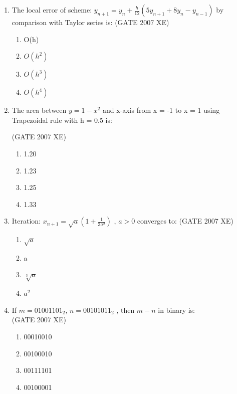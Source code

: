 \documentclass[journal,cmex10]{IEEEtran}
\theoremstyle{remark}
\numberwithin{equation}{enumi}
\numberwithin{figure}{enumi}
\begin{document}
\begin{enumerate}[label=\arabic*)]
    \item The local error of scheme: $y_{n+1} = y_n + \frac{h}{12} (5y_{n+1} + 8y_n - y_{n-1})$ by comparison with Taylor series is:
    \hfill{(GATE 2007 XE)}
    \begin{multicols}{4}
    \begin{enumerate}
        \item O(h)
        \item $O(h^2)$
        \item $O(h^3)$ 
        \item $O(h^4)$
    \end{enumerate}
\end{multicols}

    \item The area between $y = 1 - x^2$ and x-axis from x = -1 to x = 1 using Trapezoidal rule with h = 0.5 is:

    \hfill{(GATE 2007 XE)}
    \begin{multicols}{4}
    \begin{enumerate}
        \item 1.20
        \item 1.23
        \item 1.25
        \item 1.33
    \end{enumerate}
\end{multicols}

    \item Iteration: $x_{n+1} = \sqrt{a} \left(1 + \frac{1}{3a^2}\right)$ , $a > 0$ converges to:
    \hfill{(GATE 2007 XE)}
    \begin{multicols}{4}
    \begin{enumerate}
        \item $\sqrt{a}$
        \item a
        \item $\sqrt[3]{a}$
        \item $a^2$
    \end{enumerate}
    \end{multicols}

    \item If $m = 01001101_2$, $n = 00101011_2$ , then $m - n$ in binary is:\\
    \hfill{(GATE 2007 XE)}
    \begin{multicols}{4}
    \begin{enumerate}
        \item 00010010
        \item 00100010
        \item 00111101
        \item 00100001
    \end{enumerate}
\end{multicols}


\end{enumerate}
\end{document}
